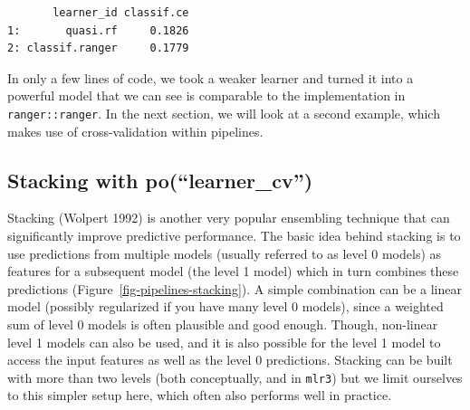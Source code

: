 \begin{Shaded}
\begin{Highlighting}[]
\OtherTok{=} \NormalTok{(}\NormalTok{(}\NormalTok{),}
  \NormalTok{(}\NormalTok{, } \NormalTok{)),}
  \NormalTok{(}\NormalTok{, } \NormalTok{)}
\NormalTok{)}
\OtherTok{=} 
\SpecialCharTok{$}
\end{Highlighting}
\end{Shaded}

\begin{verbatim}
       learner_id classif.ce
1:       quasi.rf     0.1826
2: classif.ranger     0.1779
\end{verbatim}

In only a few lines of code, we took a weaker learner and turned it into
a powerful model that we can see is comparable to the implementation in
\texttt{ranger::ranger}. In the next section, we will look at a second
example, which makes use of cross-validation within pipelines.

\hypertarget{sec-pipelines-stack}{%
\subsection{Stacking with
po(``learner\_cv'')}\label{sec-pipelines-stack}}

Stacking (Wolpert 1992) is another very popular
ensembling technique that can significantly improve predictive
performance. The basic idea behind stacking is to use predictions from
multiple models (usually referred to as level 0 models) as features for
a subsequent model (the level 1 model) which in turn combines these
predictions (Figure~\ref{fig-pipelines-stacking}). A simple combination
can be a linear model (possibly regularized if you have many level 0
models), since a weighted sum of level 0 models is often plausible and
good enough. Though, non-linear level 1 models can also be used, and it
is also possible for the level 1 model to access the input features as
well as the level 0 predictions. Stacking can be built with more than
two levels (both conceptually, and in \texttt{mlr3}) but we limit
ourselves to this simpler setup here, which often also performs well in
practice.


